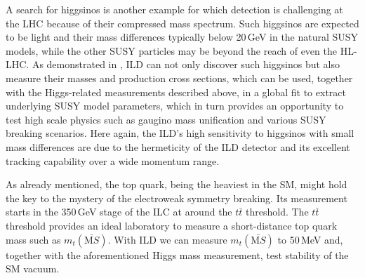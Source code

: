 A search for higgsinos is another example for which detection is challenging at the LHC because of their compressed mass spectrum. Such higgsinos are expected to be light and their mass differences typically below 20\,GeV in the natural SUSY models, while the other SUSY particles may be beyond the reach of even the HL-LHC. As demonstrated in \cite{Baer:2016new}, ILD can not only discover such higgsinos but also measure their masses and production cross sections, which can be used, together with the Higgs-related measurements described above, in a global fit to extract underlying SUSY model parameters, which in turn provides an opportunity to test high scale physics such as gaugino mass unification and various SUSY breaking scenarios. Here again, the ILD's high sensitivity to higgsinos with small mass differences are due to the hermeticity of the ILD detector and its excellent tracking capability over a wide momentum range.

As already mentioned, the top quark, being the heaviest in the SM, might hold the key to the mystery of the electroweak symmetry breaking. Its measurement starts in the 350\,GeV stage of the ILC at around the $t\bar{t}$ threshold. The $t\bar{t}$ threshold provides an ideal laboratory to measure a short-distance top quark mass such as $m_t(\bar{\mathrm MS})$. With ILD we can measure $m_t(\bar{\mathrm MS})$ to 50\,MeV\cite{Horiguchi:2013wra, Vos:2016ti} and, together with the aforementioned Higgs mass measurement, test stability of the SM vacuum. 

